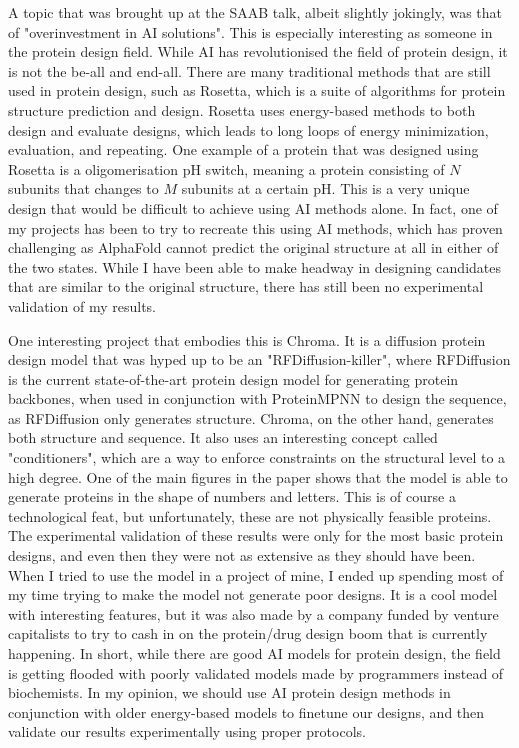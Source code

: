 \documentclass[a4paper, 11pt]{article} %
\begin{document}
A topic that was brought up at the SAAB talk, albeit slightly jokingly, was that of "overinvestment in AI solutions". This is especially interesting as someone in the protein design field. While AI has revolutionised the field of protein design, it is not the be-all and end-all. There are many traditional methods that are still used in protein design, such as Rosetta, which is a suite of algorithms for protein structure prediction and design. Rosetta uses energy-based methods to both design and evaluate designs, which leads to long loops of energy minimization, evaluation, and repeating. One example of a protein that was designed using Rosetta is a oligomerisation pH switch, meaning a protein consisting of $N$ subunits that changes to $M$ subunits at a certain pH\cite{lizatovicNovoDesignedCoiledCoil2016}. This is a very unique design that would be difficult to achieve using AI methods alone. In fact, one of my projects has been to try to recreate this using AI methods, which has proven challenging as AlphaFold cannot predict the original structure at all in either of the two states. While I have been able to make headway in designing candidates that are similar to the original structure, there has still been no experimental validation of my results.

One interesting project that embodies this is Chroma\cite{ingrahamIlluminatingProteinSpace2023}. It is a diffusion protein design model that was hyped up to be an "RFDiffusion-killer", where RFDiffusion is the current state-of-the-art protein design model for generating protein backbones, when used in conjunction with ProteinMPNN to design the sequence, as RFDiffusion only generates structure. Chroma, on the other hand, generates both structure and sequence. It also uses an interesting concept called "conditioners", which are a way to enforce constraints on the structural level to a high degree. One of the main figures in the paper shows that the model is able to generate proteins in the shape of numbers and letters. This is of course a technological feat, but unfortunately, these are not physically feasible proteins. The experimental validation of these results were only for the most basic protein designs, and even then they were not as extensive as they should have been. When I tried to use the model in a project of mine, I ended up spending most of my time trying to make the model not generate poor designs. It is a cool model with interesting features, but it was also made by a company funded by venture capitalists to try to cash in on the protein/drug design boom that is currently happening. In short, while there are good AI models for protein design, the field is getting flooded with poorly validated models made by programmers instead of biochemists. In my opinion, we should use AI protein design methods in conjunction with older energy-based models to finetune our designs, and then validate our results experimentally using proper protocols.
\end{document}
